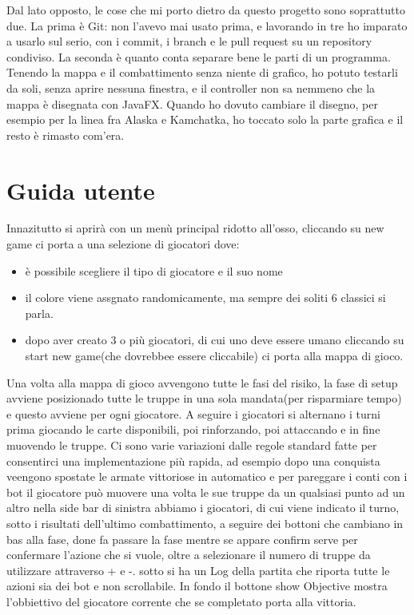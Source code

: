 \documentclass[a4paper,12pt]{report}
\begin{document}
Dal lato opposto, le cose che mi porto dietro da questo progetto sono soprattutto due. La prima è Git: non l'avevo mai usato prima, e lavorando in tre ho imparato a usarlo sul serio, con i commit, i branch e le pull request su un repository condiviso. La seconda è quanto conta separare bene le parti di un programma. Tenendo la mappa e il combattimento senza niente di grafico, ho potuto testarli da soli, senza aprire nessuna finestra, e il controller non sa nemmeno che la mappa è disegnata con JavaFX. Quando ho dovuto cambiare il disegno, per esempio per la linea fra Alaska e Kamchatka, ho toccato solo la parte grafica e il resto è rimasto com'era.

\appendix
\chapter{Guida utente}
Innazitutto si aprirà con un menù principal ridotto all'osso, cliccando su new game ci porta a una selezione di giocatori dove:
 \begin{itemize}
     \item è possibile scegliere il tipo di giocatore e il suo nome
     \item il colore viene assgnato randomicamente, ma sempre dei soliti 6 classici si parla.
     \item dopo aver creato 3 o più giocatori, di cui uno deve essere umano cliccando su start new game(che dovrebbee essere cliccabile) ci porta alla mappa di gioco.
 \end{itemize}
 Una volta alla mappa di gioco avvengono tutte le fasi del risiko, la fase di setup avviene posizionado tutte le truppe in una sola mandata(per risparmiare tempo) e questo avviene per ogni giocatore.
 A seguire i giocatori si alternano i turni prima giocando le carte disponibili, poi rinforzando, poi attaccando e in fine muovendo le truppe. Ci sono varie variazioni dalle regole standard fatte per consentirci una implementazione più rapida, ad esempio dopo una conquista veengono spostate le armate vittoriose in automatico e per pareggare i conti con i bot il giocatore può muovere una volta le sue truppe da un qualsiasi punto ad un altro nella side bar di sinistra abbiamo i giocatori, di cui viene indicato il turno, sotto i risultati dell'ultimo combattimento, a seguire dei bottoni che cambiano in bas alla fase, done fa passare la fase mentre se appare confirm serve per confermare l'azione che si vuole, oltre a selezionare il numero di truppe da utilizzare attraverso + e -. sotto si ha un Log della partita che riporta tutte le azioni sia dei bot e non scrollabile. In fondo il bottone show Objective mostra l'obbiettivo del giocatore corrente che se completato porta alla vittoria.
\end{document}
